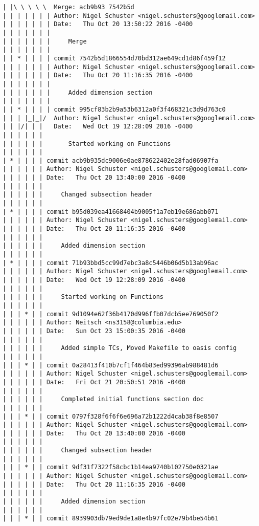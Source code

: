 \begin{lstlisting}
| |\ \ \ \ \  Merge: acb9b93 7542b5d
| | | | | | | Author: Nigel Schuster <nigel.schusters@googlemail.com>
| | | | | | | Date:   Thu Oct 20 13:50:22 2016 -0400
| | | | | | | 
| | | | | | |     Merge
| | | | | | |        
| | * | | | | commit 7542b5d1866554d70bd312ae649cd1d86f459f12
| | | | | | | Author: Nigel Schuster <nigel.schusters@googlemail.com>
| | | | | | | Date:   Thu Oct 20 11:16:35 2016 -0400
| | | | | | | 
| | | | | | |     Added dimension section
| | | | | | |        
| | * | | | | commit 995cf83b2b9a53b6312a0f3f468321c3d9d763c0
| | | |_|_|/  Author: Nigel Schuster <nigel.schusters@googlemail.com>
| | |/| | |   Date:   Wed Oct 19 12:28:09 2016 -0400
| | | | | |   
| | | | | |       Started working on Functions
| | | | | |       
| * | | | | commit acb9b935dc9006e0ae878622402e28fad06907fa
| | | | | | Author: Nigel Schuster <nigel.schusters@googlemail.com>
| | | | | | Date:   Thu Oct 20 13:40:00 2016 -0400
| | | | | | 
| | | | | |     Changed subsection header
| | | | | |       
| * | | | | commit b95d039ea41668404b9005f1a7eb19e686abb071
| | | | | | Author: Nigel Schuster <nigel.schusters@googlemail.com>
| | | | | | Date:   Thu Oct 20 11:16:35 2016 -0400
| | | | | | 
| | | | | |     Added dimension section
| | | | | |       
| * | | | | commit 71b93bbd5cc99d7ebc3a8c5446b06d5b13ab96ac
| | | | | | Author: Nigel Schuster <nigel.schusters@googlemail.com>
| | | | | | Date:   Wed Oct 19 12:28:09 2016 -0400
| | | | | | 
| | | | | |     Started working on Functions
| | | | | |       
| | | * | | commit 9d1094e62f36b4170d996ffb07dcb5ee769050f2
| | | | | | Author: Neitsch <ns3158@columbia.edu>
| | | | | | Date:   Sun Oct 23 15:00:35 2016 -0400
| | | | | | 
| | | | | |     Added simple TCs, Moved Makefile to oasis config
| | | | | |       
| | | * | | commit 0a28413f410b7cf1f464b83ed99396ab988481d6
| | | | | | Author: Nigel Schuster <nigel.schusters@googlemail.com>
| | | | | | Date:   Fri Oct 21 20:50:51 2016 -0400
| | | | | | 
| | | | | |     Completed initial functions section doc
| | | | | |       
| | | * | | commit 0797f328f6f6f6e696a72b1222d4cab38f8e8507
| | | | | | Author: Nigel Schuster <nigel.schusters@googlemail.com>
| | | | | | Date:   Thu Oct 20 13:40:00 2016 -0400
| | | | | | 
| | | | | |     Changed subsection header
| | | | | |       
| | | * | | commit 9df31f7322f58cbc1b14ea9740b102750e0321ae
| | | | | | Author: Nigel Schuster <nigel.schusters@googlemail.com>
| | | | | | Date:   Thu Oct 20 11:16:35 2016 -0400
| | | | | | 
| | | | | |     Added dimension section
| | | | | |       
| | | * | | commit 8939903db79ed9de1a8e4b97fc02e79b4be54b61

\end{lstlisting}
